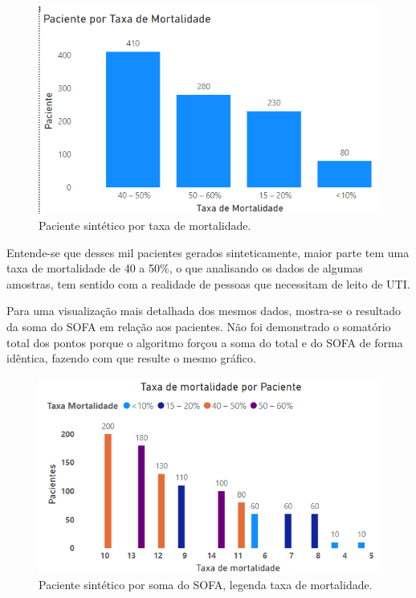 \documentclass[12pt]{article}
\begin{document}
\begin{figure}[!htb]
    \centering
    \includegraphics[scale=0.9]{img/Taxa de Mortalidade2.png}
    \centering
    \caption{Paciente sintético por taxa de mortalidade.}
    \label{Paciente-gerado-taxa-mortalidade}
\end{figure}

Entende-se que desses mil pacientes gerados sinteticamente, maior parte tem uma taxa de mortalidade de 40 a 50\%, o que analisando os dados de algumas amostras, tem sentido com a realidade de pessoas que necessitam de leito de UTI.

Para uma visualização mais detalhada dos mesmos dados, mostra-se o resultado da soma do SOFA em relação aos pacientes. Não foi demonstrado o somatório total dos pontos porque o algoritmo forçou a soma do total e do SOFA de forma idêntica, fazendo com que resulte o mesmo gráfico.

\begin{figure}[!htb]
    \centering
    \includegraphics[scale=0.9]{img/Taxa de Mortalidade.png}
    \centering
    \caption{Paciente sintético por soma do SOFA, legenda taxa de mortalidade.}
    \label{Paciente-gerado-por-SOFA-legenda-taxa-mortalidade}
\end{figure}
\end{document}
